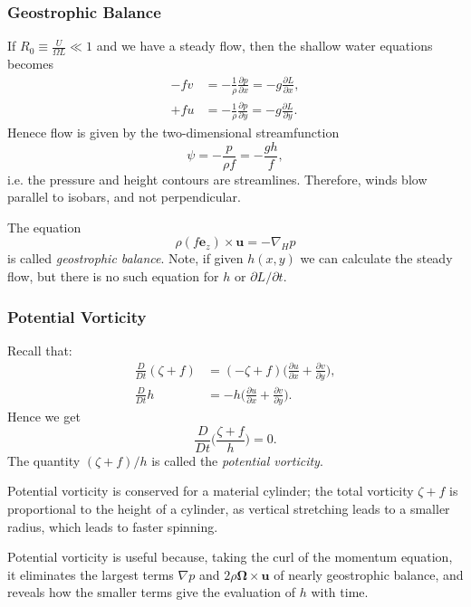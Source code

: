 \documentclass[12pt]{article}
\begin{document}
\subsubsection{Geostrophic Balance}
\label{subsub:geostrophic_balance}

If $R_0 \equiv \frac{U}{\Omega L} \ll 1$ and we have a steady flow, then the shallow water equations becomes
\begin{align*}
	-fv &= - \frac{1}{\rho} \frac{\partial p}{\partial x} = - g \frac{\partial L}{\partial x}, \\
	+fu &= - \frac{1}{\rho} \frac{\partial p}{\partial y} = - g\frac{\partial L}{\partial y}.
\end{align*}
Henece flow is given by the two-dimensional streamfunction
\[
\psi = - \frac{p}{\rho f} = - \frac{gh}{f},
\]
i.e. the pressure and height contours are streamlines. Therefore, winds  blow parallel to isobars, and not perpendicular.

The equation
\[
\rho (f \mathbf{e}_z) \times \mathbf{u} = - \nabla_H p
\]
is called \emph{geostrophic balance}. Note, if given $h(x, y)$ we can calculate the steady flow, but there is no such equation for $h$ or $\partial L/\partial t$.

\subsubsection{Potential Vorticity}
\label{subsub:potential_vorticity}

Recall that:
\begin{align*}
	\frac{D}{Dt}(\zeta + f) &= (-\zeta + f) \biggl( \frac{\partial u}{\partial x} + \frac{\partial v}{\partial y}\biggr), \\
	\frac{D}{Dt} h &= - h \biggl( \frac{\partial u}{\partial x} + \frac{\partial v}{\partial y} \biggr).
\end{align*}
Hence we get
\[
\frac{D}{Dt} \biggl( \frac{\zeta + f}{h} \biggr) = 0.
\]
The quantity $(\zeta + f)/h$ is called the \emph{potential vorticity}.

Potential vorticity is conserved for a material cylinder; the total vorticity $\zeta + f$ is proportional to the height of a cylinder, as vertical stretching leads to a smaller radius, which leads to faster spinning.

Potential vorticity is useful because, taking the curl of the momentum equation, it eliminates the largest terms $\nabla p$ and $2 \rho \bm{\Omega} \times \mathbf{u}$ of nearly geostrophic balance, and reveals how the smaller terms give the evaluation of $h$ with time.
\end{document}
